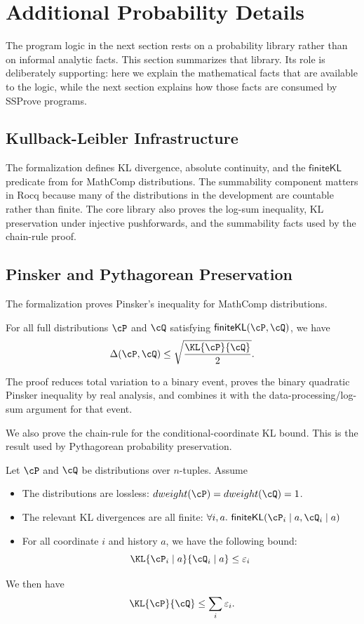 \section{Additional Probability Details}
\label{sec:verified-kl-analysis}

The program logic in the next section rests on a probability library rather than on informal analytic facts.
This section summarizes that library.
Its role is deliberately supporting: here we explain the mathematical facts that are available to the logic, while the next section explains how those facts are consumed by SSProve programs.

\subsection{Kullback-Leibler Infrastructure}

The formalization defines KL divergence, absolute continuity, and the \(\mathsf{finiteKL}\) predicate from  for MathComp distributions.
The summability component matters in Rocq because many of the distributions in the development are countable rather than finite.
The core library also proves the log-sum inequality, KL preservation under injective pushforwards, and the summability facts used by the chain-rule proof.

\subsection{Pinsker and Pythagorean Preservation}

The formalization proves Pinsker's inequality for MathComp distributions.
\begin{lemma}
    For all full distributions $\cP$ and $\cQ$ satisfying $\mathsf{finiteKL}(\cP,\cQ)$, we have
    \begin{equation}
        \Delta(\cP,\cQ)
  \leq
  \sqrt{\frac{\KL{\cP}{\cQ}}{2}}.
    \end{equation}
\end{lemma}
The proof reduces total variation to a binary event, proves the binary quadratic Pinsker inequality by real analysis, and combines it with the data-processing/log-sum argument for that event.

We also prove the chain-rule for the conditional-coordinate KL bound.
This is the result used by Pythagorean probability preservation.
\begin{lemma}
Let $\cP$ and $\cQ$ be distributions over $n$-tuples.
Assume
\begin{itemize}
    \item The distributions are lossless: $dweight(\cP)=dweight(\cQ)=1$.
    \item The relevant KL divergences are all finite:
    $\forall i,a.\ 
    \mathsf{finiteKL}(\cP_i\mid a,\cQ_i\mid a)$
    \item For all coordinate $i$ and history $a$, we have the following bound:
    $$\KL{\cP_i\mid a}{\cQ_i\mid a}\leq \varepsilon_i$$
\end{itemize}
We then have
\[
  \KL{\cP}{\cQ}\leq \sum_i \varepsilon_i .
\]
\end{lemma}

